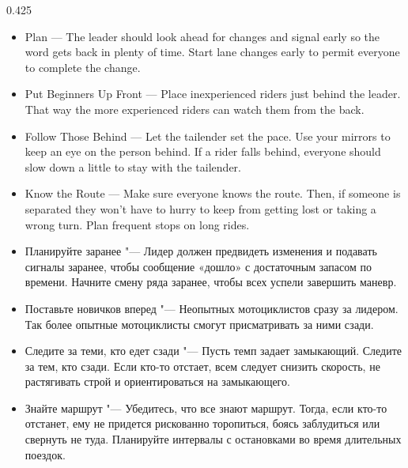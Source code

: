 \begin{langblock}{0.425}
	\begin{eng}
	
	\begin{itemize}[noitemsep]
		\item Plan --- The leader should look ahead for changes and signal early so the word gets back in plenty of time. Start lane changes early to permit everyone to complete the change.
		\item Put Beginners Up Front --- Place inexperienced riders just behind the leader. That way the more experienced riders can watch them from the back.
		\item Follow Those Behind --- Let the tailender set the pace. Use your mirrors to keep an eye on the person behind. If a rider falls behind, everyone should slow down a little to stay with the tailender.
		\item Know the Route --- Make sure everyone knows the route. Then, if someone is separated they won't have to hurry to keep from getting lost or taking a wrong turn. Plan frequent stops on long rides.
	\end{itemize}
	\end{eng}
	\begin{rus}
		
		\begin{itemize}[noitemsep]
			\item Планируйте заранее "--- Лидер должен предвидеть изменения и подавать сигналы заранее, чтобы сообщение «дошло» с достаточным запасом по времени. Начните смену ряда заранее, чтобы всех успели завершить маневр.
			\item Поставьте новичков вперед "--- Неопытных мотоциклистов сразу за лидером. Так более опытные мотоциклисты смогут присматривать за ними сзади.
			\item Следите за теми, кто едет сзади "--- Пусть темп задает замыкающий. Следите за тем, кто сзади. Если кто-то отстает, всем следует снизить скорость, не растягивать строй и ориентироваться на замыкающего.
			\item Знайте маршрут "--- Убедитесь, что все знают маршрут. Тогда, если кто-то отстанет, ему не придется рискованно торопиться, боясь заблудиться или свернуть не туда. Планируйте интервалы с остановками во время длительных поездок.
		\end{itemize}
\end{rus}
\end{langblock}



